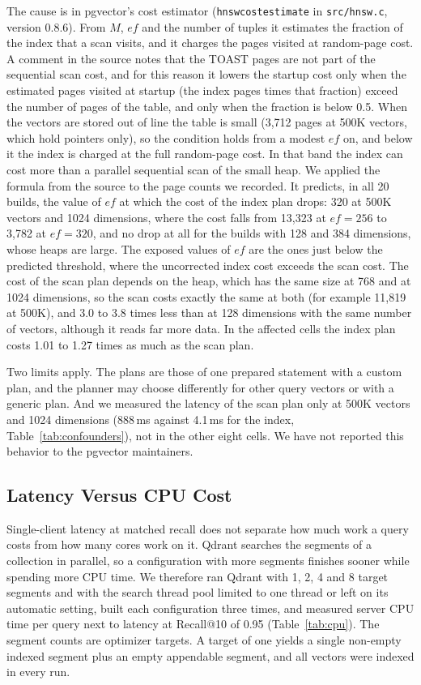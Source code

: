 \documentclass[preprint,12pt]{elsarticle}
\begin{document}
The cause is in pgvector's cost estimator (\texttt{hnswcostestimate} in \texttt{src/hnsw.c},
version 0.8.6). From $M$, $ef$ and the number of tuples it estimates the fraction of the index
that a scan visits, and it charges the pages visited at random-page cost. A comment in the
source notes that the TOAST pages are not part of the sequential scan cost, and for this reason
it lowers the startup cost only when the estimated pages visited at startup (the index pages
times that fraction) exceed the number of pages of the table, and only when the fraction is
below 0.5. When the vectors are stored out of line the table is small (3{,}712 pages at 500K
vectors, which hold pointers only), so the condition holds from a modest $ef$ on, and below it
the index is charged at the full random-page cost. In that band the index can cost more than a
parallel sequential scan of the small heap. We applied the formula from the source to the page
counts we recorded. It predicts, in all 20 builds, the value of $ef$ at which the cost of the
index plan drops: 320 at 500K vectors and 1024 dimensions, where the cost falls from 13{,}323
at $ef=256$ to 3{,}782 at $ef=320$, and no drop at all for the builds with 128 and 384
dimensions, whose heaps are large. The exposed values of $ef$ are the ones just below the
predicted threshold, where the uncorrected index cost exceeds the scan cost. The cost of the
scan plan depends on the heap, which has the same size at 768 and at 1024 dimensions, so the
scan costs exactly the same at both (for example 11{,}819 at 500K), and 3.0 to 3.8 times less
than at 128 dimensions with the same number of vectors, although it reads far more data. In the
affected cells the index plan costs 1.01 to 1.27 times as much as the scan plan.

Two limits apply. The plans are those of one prepared statement with a custom plan, and the
planner may choose differently for other query vectors or with a generic plan. And we
measured the latency of the scan plan only at 500K vectors and 1024 dimensions (888\,ms
against 4.1\,ms for the index, Table~\ref{tab:confounders}), not in the other eight cells.
We have not reported this behavior to the pgvector maintainers.

\subsection{Latency Versus CPU Cost}
\label{sec:cpu}

Single-client latency at matched recall does not separate how much work a query costs
from how many cores work on it. Qdrant searches the segments of a collection in
parallel, so a configuration with more segments finishes sooner while spending more
CPU time. We therefore ran Qdrant with 1, 2, 4 and 8 target segments and with the
search thread pool limited to one thread or left on its automatic setting, built each
configuration three times, and measured server CPU time per query next to latency at
Recall@10 of 0.95 (Table~\ref{tab:cpu}). The segment counts are optimizer targets. A
target of one yields a single non-empty indexed segment plus an empty appendable
segment, and all vectors were indexed in every run.
\end{document}
